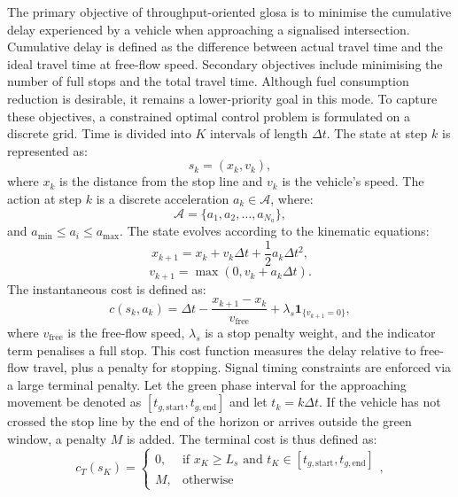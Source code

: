 The primary objective of throughput-oriented \ac{glosa} is to minimise the cumulative delay experienced by a vehicle when approaching a signalised intersection. Cumulative delay is defined as the difference between actual travel time and the ideal travel time at free-flow speed. Secondary objectives include minimising the number of full stops and the total travel time. Although fuel consumption reduction is desirable, it remains a lower-priority goal in this mode.
\mynewline
To capture these objectives, a constrained optimal control problem is formulated on a discrete grid. Time is divided into $K$ intervals of length $\Delta t$. The state at step $k$ is represented as:
\begin{equation*}
    s_k = \left(x_k, v_k\right),
\end{equation*}
where $x_k$ is the distance from the stop line and $v_k$ is the vehicle's speed. The action at step $k$ is a discrete acceleration $a_k \in \mathcal{A}$, where:
\begin{equation*}
    \mathcal{A} = \{a_1, a_2, \dots, a_{N_a}\},
\end{equation*}
and $a_{\min} \le a_i \le a_{\max}$. The state evolves according to the kinematic equations:
\begin{equation*}
    x_{k+1} = x_k + v_k\Delta t + \frac{1}{2}a_k\Delta t^2,
\end{equation*}
\begin{equation*}
    v_{k+1} = \max\left(0, v_k + a_k\Delta t\right).
\end{equation*}
The instantaneous cost is defined as:
\begin{equation*}
    c(s_k, a_k) = \Delta t - \frac{x_{k+1}-x_k}{v_{\mathrm{free}}} + \lambda_s\mathbf{1}_{\{v_{k+1}=0\}},
\end{equation*}
where $v_{\mathrm{free}}$ is the free-flow speed, $\lambda_s$ is a stop penalty weight, and the indicator term penalises a full stop. This cost function measures the delay relative to free-flow travel, plus a penalty for stopping.
\mynewline
Signal timing constraints are enforced via a large terminal penalty. Let the green phase interval for the approaching movement be denoted as $[t_{g,\mathrm{start}}, t_{g,\mathrm{end}}]$ and let $t_k=k\Delta t$. If the vehicle has not crossed the stop line by the end of the horizon or arrives outside the green window, a penalty $M$ is added. The terminal cost is thus defined as:
\begin{equation*}
c_T(s_K) =
\begin{cases}
0, & \text{if } x_K \ge L_s \text{ and } t_K\in[t_{g,\mathrm{start}},t_{g,\mathrm{end}}] \\
M, & \text{otherwise}
\end{cases}
,
\end{equation*}
